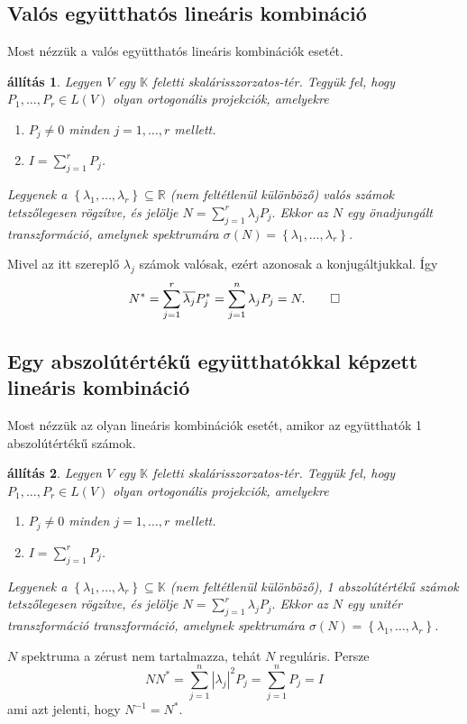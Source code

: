 \documentclass[9pt, a4paper, showtrims]{memoir}
\makeatletter
\renewenvironment{proof}[1][\proofname]
    {\par\pushQED{\qed}%
    \normalfont \topsep6\p@\@plus6\p@\relax
    \trivlist
    \item[\hskip\labelsep
        \itshape
    #1\@addpunct{:}]\ignorespaces}
    {\popQED\endtrivlist\@endpefalse}
\theoremstyle{plain}
\newtheorem{proposition}{állítás}[chapter]
\theoremstyle{remark}
\theoremstyle{definition}
\makeatother
\begin{document}
\subsection{Valós együtthatós lineáris kombináció}
Most nézzük a valós együtthatós lineáris kombinációk esetét.
\begin{proposition}\label{pr:normlinkombvalos}
	Legyen $V$ egy $\mathbb{K}$ feletti skalárisszorzatos-tér.
	Tegyük fel, hogy $P_1,\ldots,P_r\in L\left( V \right)$ olyan ortogonális projekciók,
	amelyekre
	\begin{enumerate}
		\item $P_j\neq 0$ minden $j=1,\ldots,r$ mellett.
		\item $I=\sum_{j=1}^rP_j$.
	\end{enumerate}
	Legyenek a $\left\{ \lambda_1,\ldots,\lambda_r \right\}\subseteq \mathbb{R}$
	(nem feltétlenül különböző) valós számok tetszőlegesen rögzítve,
	és jelölje
	\(
	N
	=
	\sum_{j=1}^r\lambda_jP_j.
	\)
	Ekkor az $N$ egy \emph{önadjungált} transzformáció,
	amelynek spektrumára $\sigma\left( N \right)=\left\{ \lambda_1,\ldots,\lambda_r \right\}$.
\end{proposition}
\begin{proof}
	Mivel az itt szereplő $\lambda_j$ számok valósak,
	ezért azonosak a konjugáltjukkal.
	Így
	\begin{displaymath}
		N^\ast=
		\sum_{j=1}^r\overline{\lambda_j}P_j^\ast
		=
		\sum_{j=1}^n\lambda_jP_j
		=N.
		\qedhere
	\end{displaymath}
\end{proof}

\subsection{Egy abszolútértékű együtthatókkal képzett lineáris kombináció}
Most nézzük az olyan lineáris kombinációk esetét, amikor az együtthatók 1 abszolútértékű számok.
\begin{proposition}\label{pr:normlinkombegys}
	Legyen $V$ egy $\mathbb{K}$ feletti skalárisszorzatos-tér.
	Tegyük fel, hogy $P_1,\ldots,P_r\in L\left( V \right)$ olyan ortogonális projekciók,
	amelyekre
	\begin{enumerate}
		\item $P_j\neq 0$ minden $j=1,\ldots,r$ mellett.
		\item $I=\sum_{j=1}^rP_j$.
	\end{enumerate}
	Legyenek a $\left\{ \lambda_1,\ldots,\lambda_r \right\}\subseteq \mathbb{K}$
	(nem feltétlenül különböző),
	1 abszolútértékű számok tetszőlegesen rögzítve,
	és jelölje
	\(
	N
	=
	\sum_{j=1}^r\lambda_jP_j.
	\)
	Ekkor az $N$ egy \emph{unitér transzformáció} transzformáció,
	amelynek spektrumára $\sigma\left( N \right)=\left\{ \lambda_1,\ldots,\lambda_r \right\}$.
\end{proposition}
\begin{proof}
	$N$ spektruma a zérust nem tartalmazza, tehát $N$ reguláris.
	Persze $$NN^\ast=\sum_{j=1}^n|\lambda_j|^2P_j=\sum_{j=1}^nP_j=I$$ ami azt jelenti,
	hogy $N^{-1}=N^\ast$.
\end{proof}
\end{document}
